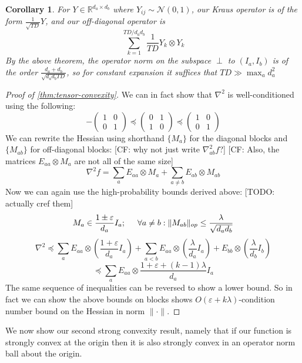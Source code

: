\documentclass{article}
\newtheorem{corollary}{Corollary}
\newcommand{\R}{{\mathbb{R}}}
\newcommand\eps{\varepsilon}
\newcommand{\CF}[1]{{\color{purple}[CF: #1]}}
\newcommand{\TODO}[1]{{\color{blue}[TODO: #1]}}
\begin{document}
\begin{corollary}
For $Y \in \R^{d_{a} \times d_{b}}$ where $Y_{ij} \sim \mathcal{N}(0,1)$, our Kraus operator is of the form $\frac{1}{\sqrt{TD}} Y$, and our off-diagonal operator is
\[ \sum_{k=1}^{TD/d_{a}d_{b}} \frac{1}{TD} Y_{k} \otimes Y_{k}   \]
By the above theorem, the operator norm on the subspace $\perp$ to $(I_{a},I_{b})$ is of the order $\frac{d_{a}+d_{b}}{\sqrt{d_{a} d_{b} TD}}$, so for constant expansion it suffices that $TD \gg \max_{a} d_{a}^{2}$
\end{corollary}
\begin{proof}[Proof of \cref{thm:tensor-convexity}]
We can in fact show that $\nabla^{2}$ is well-conditioned using the following:
\[ -\begin{pmatrix} 1 & 0 \\ 0 & 1 \end{pmatrix}
\preceq \begin{pmatrix} 0 & 1 \\ 1 & 0 \end{pmatrix}
\preceq \begin{pmatrix} 1 & 0 \\ 0 & 1 \end{pmatrix}
\]
We can rewrite the Hessian using shorthand $\{M_{a}\}$ for the diagonal blocks and $\{M_{ab}\}$ for off-diagonal blocks: \CF{why not just write $\nabla^2_{ab}f$?} \CF{Also, the matrices $E_{aa} \otimes M_a$ are not all of the same size}
\[ \nabla^{2} f = \sum_{a} E_{aa} \otimes M_{a} + \sum_{a \neq b} E_{ab} \otimes M_{ab}  \]
Now we can again use the high-probability bounds derived above: \TODO{actually cref them}
\[ M_{a} \in \frac{1 \pm \eps}{d_{a}} I_{a}; \hspace{5mm} \forall a \neq b: \|M_{ab}\|_{op} \leq \frac{\lambda}{\sqrt{d_{a} d_{b}}}   \]
\[ \nabla^{2} \preceq \sum_{a} E_{aa} \otimes \left( \frac{1+\eps}{d_{a}} I_{a} \right) + \sum_{a < b} E_{aa} \otimes \left( \frac{\lambda}{d_{a}} I_{a} \right) + E_{bb} \otimes \left( \frac{\lambda}{d_{b}} I_{b} \right)    \]
\[ \preceq \sum_{a} E_{aa} \otimes \frac{1+\eps+(k-1)\lambda}{d_{a}} I_{a}  \]
The same sequence of inequalities can be reversed to show a lower bound. So in fact we can show the above bounds on blocks shows $O(\eps + k \lambda)$-condition number bound on the Hessian in norm $\|\cdot\|$.
\end{proof}
We now show our second strong convexity result, namely that if our function is strongly convex at the origin then it is also strongly convex in an operator norm ball about the origin.
\end{document}
